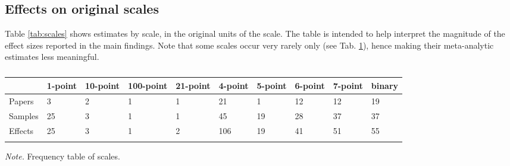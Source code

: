 \documentclass[
  doc,floatsintext]{apa6}
\begin{document}
\subsection{Effects on original scales}\label{effects-on-original-scales}

Table \ref{tab:scales} shows estimates by scale, in the original units of the scale. The table is intended to help interpret the magnitude of the effect sizes reported in the main findings. Note that some scales occur very rarely only (see Tab. \ref{tab:n-scales}), hence making their meta-analytic estimates less meaningful.

\begin{table}[tbp]

\begin{center}
\begin{threeparttable}

\caption{\label{tab:n-scales}}

\begin{tabular}{llllllllll}
\toprule
 & \multicolumn{1}{c}{1-point} & \multicolumn{1}{c}{10-point} & \multicolumn{1}{c}{100-point} & \multicolumn{1}{c}{21-point} & \multicolumn{1}{c}{4-point} & \multicolumn{1}{c}{5-point} & \multicolumn{1}{c}{6-point} & \multicolumn{1}{c}{7-point} & \multicolumn{1}{c}{binary}\\
\midrule
Papers & 3 & 2 & 1 & 1 & 21 & 1 & 12 & 12 & 19\\
Samples & 25 & 3 & 1 & 1 & 45 & 19 & 28 & 37 & 37\\
Effects & 25 & 3 & 1 & 2 & 106 & 19 & 41 & 51 & 55\\
\bottomrule
\addlinespace
\end{tabular}

\begin{tablenotes}[para]
\normalsize{\textit{Note.} Frequency table of scales.}
\end{tablenotes}

\end{threeparttable}
\end{center}

\end{table}
\end{document}
